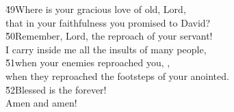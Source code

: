 \begin{poetry}
\poeml \v{49}Where is your gracious love of old, Lord, \\
\poemll    that in your faithfulness you promised to David? \\
\poeml \v{50}Remember, Lord, the reproach of your servant! \\
\poemll    I carry inside me all the insults of many people, \\
\poeml \v{51}when your enemies reproached you, , \\
\poemll    when they reproached the footsteps of your anointed. \\
\poeml \v{52}Blessed is the  forever! \\
\poemll    Amen and amen!
\end{poetry}


